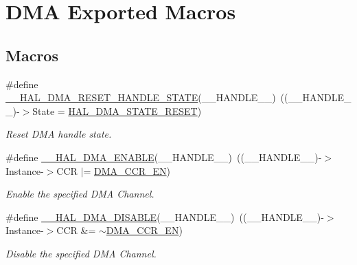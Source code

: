 \hypertarget{group___d_m_a___exported___macros}{}\section{D\+MA Exported Macros}
\label{group___d_m_a___exported___macros}
\subsection*{Macros}
\begin{DoxyCompactItemize}
\item 
\#define \hyperlink{group___d_m_a___exported___macros_gaadcee34f0999c8eafd37de2f69daa0ac}{\+\_\+\+\_\+\+H\+A\+L\+\_\+\+D\+M\+A\+\_\+\+R\+E\+S\+E\+T\+\_\+\+H\+A\+N\+D\+L\+E\+\_\+\+S\+T\+A\+TE}(\+\_\+\+\_\+\+H\+A\+N\+D\+L\+E\+\_\+\+\_\+)~((\+\_\+\+\_\+\+H\+A\+N\+D\+L\+E\+\_\+\+\_\+)-\/$>$State = \hyperlink{group___d_m_a___exported___types_gga9c012af359987a240826f29073bbe463a9e7be73da32b8c837cde0318e0d5eed2}{H\+A\+L\+\_\+\+D\+M\+A\+\_\+\+S\+T\+A\+T\+E\+\_\+\+R\+E\+S\+ET})
\begin{DoxyCompactList}\small\item\em Reset D\+MA handle state. \end{DoxyCompactList}\item 
\#define \hyperlink{group___d_m_a___exported___macros_ga93900b3ef3f87ef924eb887279a434b4}{\+\_\+\+\_\+\+H\+A\+L\+\_\+\+D\+M\+A\+\_\+\+E\+N\+A\+B\+LE}(\+\_\+\+\_\+\+H\+A\+N\+D\+L\+E\+\_\+\+\_\+)~((\+\_\+\+\_\+\+H\+A\+N\+D\+L\+E\+\_\+\+\_\+)-\/$>$Instance-\/$>$C\+CR $\vert$= \hyperlink{group___peripheral___registers___bits___definition_gababa3817d21a78079be76bc26b2c10f2}{D\+M\+A\+\_\+\+C\+C\+R\+\_\+\+EN})
\begin{DoxyCompactList}\small\item\em Enable the specified D\+MA Channel. \end{DoxyCompactList}\item 
\#define \hyperlink{group___d_m_a___exported___macros_gafeef4c5e8c3f015cdecc0f37bbe063dc}{\+\_\+\+\_\+\+H\+A\+L\+\_\+\+D\+M\+A\+\_\+\+D\+I\+S\+A\+B\+LE}(\+\_\+\+\_\+\+H\+A\+N\+D\+L\+E\+\_\+\+\_\+)~((\+\_\+\+\_\+\+H\+A\+N\+D\+L\+E\+\_\+\+\_\+)-\/$>$Instance-\/$>$C\+CR \&= $\sim$\hyperlink{group___peripheral___registers___bits___definition_gababa3817d21a78079be76bc26b2c10f2}{D\+M\+A\+\_\+\+C\+C\+R\+\_\+\+EN})
\begin{DoxyCompactList}\small\item\em Disable the specified D\+MA Channel. \end{DoxyCompactList}\item 

\end{DoxyCompactItemize}
